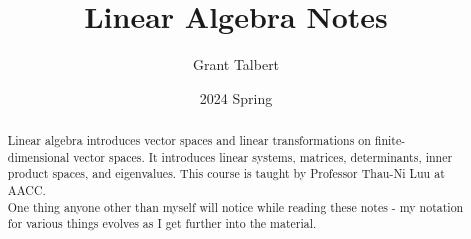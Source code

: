 \documentclass[12pt, letterpaper]{report}
\title{Linear Algebra Notes}
\author{Grant Talbert}
\date{2024 Spring}
\begin{document}
	\maketitle
	
	\begin{abstract}
		Linear algebra introduces vector spaces and linear transformations on finite-dimensional vector spaces. It introduces linear systems, matrices, determinants, inner product spaces, and eigenvalues. This course is taught by Professor Thau-Ni Luu at AACC.\\
		One thing anyone other than myself will notice while reading these notes - my notation for various things evolves as I get further into the material.
	\end{abstract}
	
	\newpage
	
	\tableofcontents
	
	\newpage



%

\end{document}
